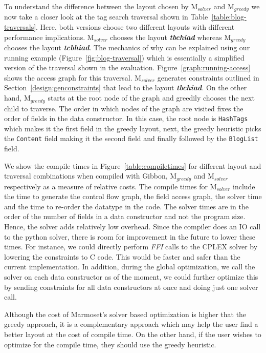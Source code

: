 \documentclass[acmsmall,review,anonymous]{acmart}\settopmatter{printfolios=true,printccs=false,printacmref=false}
\newcommand{\figref}[1]{Figure~\ref{#1}\xspace}
\newcommand{\system}{{\sc Marmoset}\xspace}
\newcommand{\systemSolver}{{\sc M$_{\mathit{solver}}$}\xspace}
\newcommand{\systemGreedy}{{\sc M$_{\mathit{greedy}}$}\xspace}
\newcommand{\gibbon}{{\sc Gibbon}\xspace}
\begin{document}
To understand the difference between the layout chosen by \systemSolver and \systemGreedy we now take a closer look at the tag search traversal shown in Table~\ref{table:blog-traversals}.
Here, both versions choose two different layouts with different performance implications. \systemSolver chooses the layout \textbf{\textit{tbchiad}} whereas \systemGreedy chooses 
the layout \textbf{\textit{tcbhiad}}. The mechanics of why can be explained using our running example (Figure~\ref{fig:blog-traversal}) which is essentially a simplified version of the 
traversal shown in the evaluation. Figure~\ref{graph:running-access} shows the access graph for this traversal. \systemSolver generates constraints 
outlined in Section~\ref{design:genconstraints} that lead to the layout \textbf{\textit{tbchiad}}. On the other hand, \systemGreedy starts at the root node of the graph and greedily chooses the next child to traverse. 
The order in which nodes of the graph are visited fixes the order of fields in the data constructor. In this case, the root node is \lstinline|HashTags| which makes it the first field in the greedy 
layout, next, the greedy heuristic picks the \lstinline|Content| field making it the second field and finally followed by the \lstinline|BlogList| field.

We show the compile times in \figref{table:compiletimes} for different layout and traversal combinations when compiled with \gibbon, \systemGreedy and \systemSolver respectively as 
a measure of relative costs. The compile times for \systemSolver include the time to generate the control flow graph, the field access graph, the solver time and the time to re-order the datatype in the code.
The solver times are in the order of the number of fields in a data constructor and not the program size. Hence, the solver adds relatively low overhead.
Since the compiler does an IO call to the python solver, there is room for improvement in the future to lower these times. 
For instance, we could directly perform \textit{FFI} calls to the CPLEX solver by lowering the constraints to C code. 
This would be faster and safer than the current implementation. In addition, during the global optimization, we call the solver on each data constructor as of the moment, 
we could further optimize this by sending constraints for all data constructors at once and doing just one solver call. 

Although the cost of \system's solver based optimization is higher that the greedy approach, it is a complementary approach 
which may help the user find a better layout at the cost of compile time. On the other hand, if the user wishes to optimize 
for the compile time, they should use the greedy heuristic.
\end{document}
